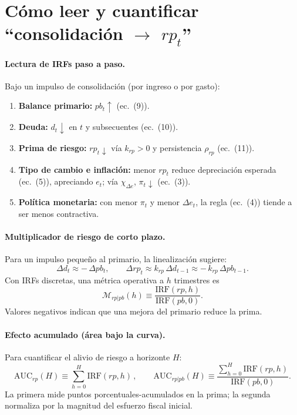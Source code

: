\documentclass[12pt]{article}
\begin{document}

\section*{Cómo leer y cuantificar ``consolidación $\rightarrow$ $rp_t$''}

\paragraph{Lectura de IRFs paso a paso.}
Bajo un impulso de consolidación (por ingreso o por gasto):
\begin{enumerate}
    \item \textbf{Balance primario:} $pb_t \uparrow$ (ec.~(9)).
    \item \textbf{Deuda:} $d_t \downarrow$ en $t$ y subsecuentes (ec.~(10)).
    \item \textbf{Prima de riesgo:} $rp_t \downarrow$ vía $k_{rp}>0$ y persistencia $\rho_{rp}$ (ec.~(11)).
    \item \textbf{Tipo de cambio e inflación:} menor $rp_t$ reduce depreciación esperada (ec.~(5)), apreciando $e_t$; vía $\chi_{\Delta e}$, $\pi_t \downarrow$ (ec.~(3)).
    \item \textbf{Política monetaria:} con menor $\pi_t$ y menor $\Delta e_t$, la regla (ec.~(4)) tiende a ser menos contractiva.
\end{enumerate}

\paragraph{Multiplicador de riesgo de corto plazo.}
Para un impulso pequeño al primario, la linealización sugiere:
\[
\Delta d_t \approx -\, \Delta pb_t,
\qquad
\Delta rp_t \approx k_{rp}\,\Delta d_{t-1} \approx -\,k_{rp}\,\Delta pb_{t-1}.
\]
Con IRFs discretas, una métrica operativa a $h$ trimestres es
\[
\mathcal{M}_{rp|pb}(h) \equiv 
\frac{\text{IRF}(rp,h)}{\text{IRF}(pb,0)}.
\]
Valores negativos indican que una mejora del primario reduce la prima.

\paragraph{Efecto acumulado (área bajo la curva).}
Para cuantificar el alivio de riesgo a horizonte $H$:
\[
\text{AUC}_{rp}(H) \equiv \sum_{h=0}^{H} \text{IRF}(rp,h)\,,
\qquad
\text{AUC}_{rp|pb}(H) \equiv 
\frac{\sum_{h=0}^{H} \text{IRF}(rp,h)}{\text{IRF}(pb,0)}.
\]
La primera mide puntos porcentuales-acumulados en la prima; la segunda normaliza por la magnitud del esfuerzo fiscal inicial.
\end{document}
